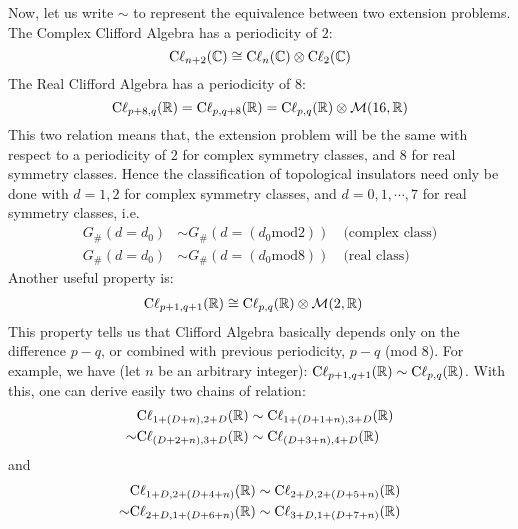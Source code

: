 \documentclass{article}
\begin{document}
Now, let us write $\sim$ to represent the equivalence between two extension
problems.  The Complex Clifford Algebra has a periodicity of $2$:
\begin{equation}
    \mathrm{C\ell}_{n+2}(\mathbb{C}) \cong \mathrm{C\ell}_{n}(\mathbb{C})\otimes
    \mathrm{C\ell}_{2}(\mathbb{C})
\end{equation}
The Real Clifford Algebra has a periodicity of $8$:
\begin{equation}
    \mathrm{C\ell}_{p+8,q}(\mathbb{R}) = \mathrm{C\ell}_{p,q+8}(\mathbb{R}) =
    \mathrm{C\ell}_{p,q}(\mathbb{R})\otimes\mathcal{M}(16,\mathbb{R})
\end{equation}
This two relation means that, the extension problem will be the same with respect to
a periodicity of $2$ for complex symmetry classes, and $8$ for real symmetry
classes. Hence the classification of topological insulators need only be done
with $d=1,2$ for complex symmetry classes, and $d=0,1,\cdots,7$ for real
symmetry classes, i.e.
\begin{subequations}
    \label{eq:cli-periodic}
\begin{align}
    G_{\#}(d=d_0) &\sim G_{\#}(d=(d_0 \text{mod} 2)) \quad\text{(complex class)} \\
    G_{\#}(d=d_0) &\sim G_{\#}(d=(d_0 \text{mod} 8)) \quad\text{(real class)}
\end{align}
\end{subequations}
Another useful property is:
\begin{align}
    \mathrm{C\ell}_{p+1,q+1}(\mathbb{R}) &\cong
    \mathrm{C\ell}_{p,q}(\mathbb{R})\otimes\mathcal{M}(2,\mathbb{R})
\end{align}
This property tells us that Clifford Algebra basically depends only on the
difference $p-q$, or combined with previous periodicity, $p-q$ (mod $8$). For
example, we have (let $n$ be an arbitrary integer):
$\mathrm{C\ell}_{p+1,q+1}(\mathbb{R})\sim\mathrm{C\ell}_{p,q}(\mathbb{R})$. With this, one can
derive easily two chains of relation:
\begin{align}
    &\mathrm{C\ell}_{1+(D+n),2+D}(\mathbb{R}) \sim \mathrm{C\ell}_{1+(D+1+n),3+D}(\mathbb{R})
    \nonumber\\
    \sim & \mathrm{C\ell}_{(D+2+n),3+D}(\mathbb{R}) \sim \mathrm{C\ell}_{(D+3+n),4+D}(\mathbb{R})
\end{align}
and
\begin{align}
    &\mathrm{C\ell}_{1+D,2+(D+4+n)}(\mathbb{R})\sim \mathrm{C\ell}_{2+D,2+(D+5+n)}(\mathbb{R})
    \nonumber\\
    \sim& \mathrm{C\ell}_{2+D,1+(D+6+n)}(\mathbb{R}) \sim
    \mathrm{C\ell}_{3+D,1+(D+7+n)}(\mathbb{R})
\end{align}
\end{document}
